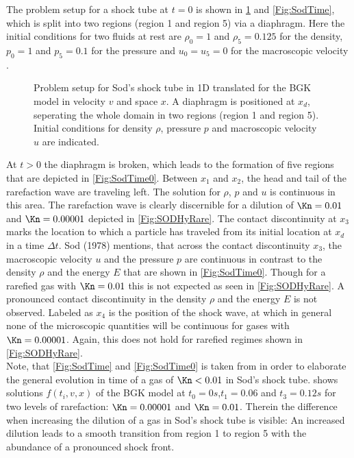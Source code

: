 The problem setup for a shock tube at \(t=0\) is shown in \cref{Fig:SodProbSetup} and \cref{Fig:SodTime}, which is split into two regions (region 1 and region 5) via a diaphragm. Here the initial conditions for two fluids at rest are \(\rho_0 = 1\) and \(\rho_5=0.125\) for the density, \(p_0=1\) and \(p_5=0.1\) for the pressure and \(u_0=u_5=0\) for the macroscopic velocity \cite{Sod}.
\begin{figure}[H]
	\centering
	
	\caption{Problem setup for Sod's shock tube in 1D translated for the BGK model in velocity \(v\) and space \(x\). A diaphragm is positioned at \(x_d\), seperating the whole domain in two regions (region 1 and region 5). Initial conditions for density \(\rho\), pressure \(p\) and macroscopic velocity \(u\) are indicated.}
	\label{Fig:SodProbSetup}
\end{figure}
At \(t>0\) the diaphragm is broken, which leads to the formation of five regions that are depicted in \cref{Fig:SodTime0}. Between \(x_1\) and \(x_2\), the head and tail of the rarefaction wave are traveling left. The solution for \(\rho\), \(p\) and \(u\) is continuous in this area. The rarefaction wave is clearly discernible for a dilution of \(\Kn=0.01\) and \(\Kn=0.00001\) depicted in \cref{Fig:SODHyRare}. The contact discontinuity at \(x_3\) marks the location to which a particle has traveled from its initial location at \(x_d\) in a time \(\Delta t\). Sod (1978) mentions, that across the contact discontinuity \(x_3\), the macroscopic velocity \(u\) and the pressure \(p\) are continuous in  contrast to the density \(\rho\) and the energy \(E\) that are shown in \cref{Fig:SodTime0}. Though for a rarefied gas with \(\Kn=0.01\) this is not expected as seen in \cref{Fig:SODHyRare}. A pronounced contact discontinuity in the density \(\rho\) and the energy \(E\) is not observed. Labeled as \(x_4\) is the position of the shock wave, at which in general none of the microscopic quantities will be continuous for gases with \(\Kn=0.00001\). Again, this does not hold for rarefied regimes shown in \cref{Fig:SODHyRare}.\\
Note, that \cref{Fig:SodTime} and \cref{Fig:SodTime0} is taken from \cite{Sod} in order to elaborate the general evolution in time of a gas of \(\Kn<0.01\) in Sod's shock tube.  shows solutions \(f(t_i,v,x)\) of the BGK model at \(t_0=0s\),\(t_1=0.06\) and \(t_3=0.12s\) for two levels of rarefaction: \(\Kn=0.00001\) and \(\Kn=0.01\). Therein the difference when increasing the dilution of a gas in Sod's shock tube is visible: An increased dilution leads to a smooth transition from region 1 to region 5 with the abundance of a pronounced shock front. 
